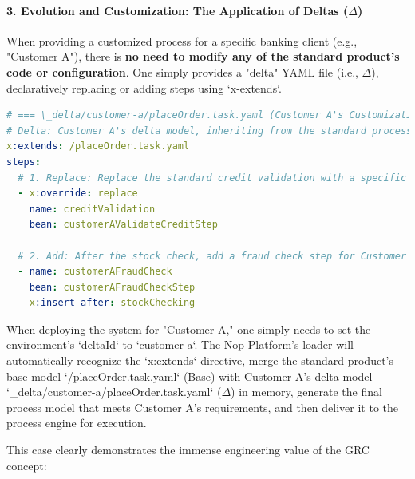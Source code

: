 \documentclass[11pt]{article}
\begin{document}
\paragraph{3. Evolution and Customization: The Application of Deltas ($\Delta$)}
When providing a customized process for a specific banking client (e.g., "Customer A"), there is \textbf{no need to modify any of the standard product's code or configuration}. One simply provides a "delta" YAML file (i.e., $\Delta$), declaratively replacing or adding steps using `x-extends`.

\begin{lstlisting}[language=YAML, caption={Customization Delta Model for Customer A}]
# === \_delta/customer-a/placeOrder.task.yaml (Customer A's Customization) ===
# Delta: Customer A's delta model, inheriting from the standard process
x:extends: /placeOrder.task.yaml
steps:
  # 1. Replace: Replace the standard credit validation with a specific version
  - x:override: replace
    name: creditValidation
    bean: customerAValidateCreditStep

  # 2. Add: After the stock check, add a fraud check step for Customer A
  - name: customerAFraudCheck
    bean: customerAFraudCheckStep
    x:insert-after: stockChecking
\end{lstlisting}
When deploying the system for "Customer A," one simply needs to set the environment's `deltaId` to `customer-a`. The Nop Platform's loader will automatically recognize the `x:extends` directive, merge the standard product's base model `/placeOrder.task.yaml` (Base) with Customer A's delta model `\_delta/customer-a/placeOrder.task.yaml` ($\Delta$) in memory, generate the final process model that meets Customer A's requirements, and then deliver it to the process engine for execution.

This case clearly demonstrates the immense engineering value of the GRC concept:
\end{document}
